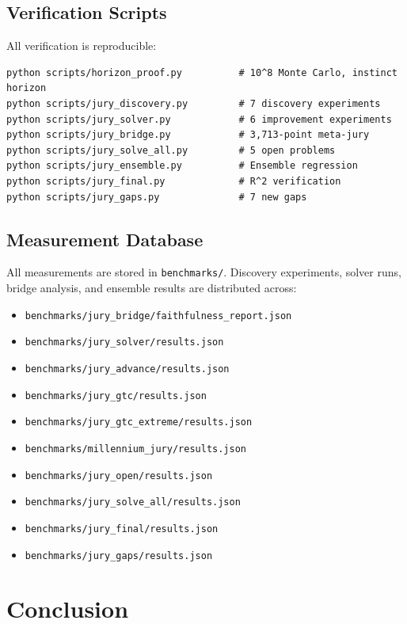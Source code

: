 \documentclass[11pt]{article}
\begin{document}
\subsection{Verification Scripts}

All verification is reproducible:

\begin{verbatim}
python scripts/horizon_proof.py          # 10^8 Monte Carlo, instinct horizon
python scripts/jury_discovery.py         # 7 discovery experiments
python scripts/jury_solver.py            # 6 improvement experiments
python scripts/jury_bridge.py            # 3,713-point meta-jury
python scripts/jury_solve_all.py         # 5 open problems
python scripts/jury_ensemble.py          # Ensemble regression
python scripts/jury_final.py             # R^2 verification
python scripts/jury_gaps.py              # 7 new gaps
\end{verbatim}

\subsection{Measurement Database}

All measurements are stored in \texttt{benchmarks/}. Discovery experiments,
solver runs, bridge analysis, and ensemble results are distributed across:
\begin{itemize}[nosep]
\item \texttt{benchmarks/jury\_bridge/faithfulness\_report.json}
\item \texttt{benchmarks/jury\_solver/results.json}
\item \texttt{benchmarks/jury\_advance/results.json}
\item \texttt{benchmarks/jury\_gtc/results.json}
\item \texttt{benchmarks/jury\_gtc\_extreme/results.json}
\item \texttt{benchmarks/millennium\_jury/results.json}
\item \texttt{benchmarks/jury\_open/results.json}
\item \texttt{benchmarks/jury\_solve\_all/results.json}
\item \texttt{benchmarks/jury\_final/results.json}
\item \texttt{benchmarks/jury\_gaps/results.json}
\end{itemize}


\section{Conclusion}
\end{document}
